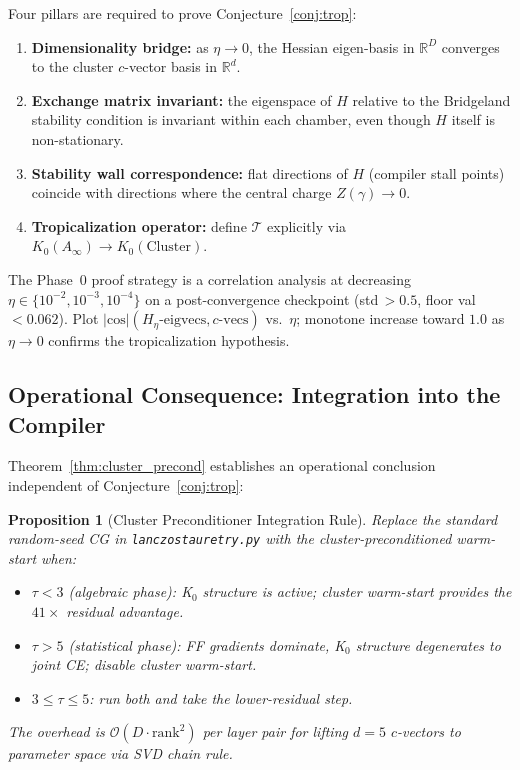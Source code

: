 \documentclass[11pt]{amsart}
\newtheorem{proposition}[theorem]{Proposition}
\begin{document}
Four pillars are required to prove Conjecture~\ref{conj:trop}:
\begin{enumerate}
\item \textbf{Dimensionality bridge:} as $\eta\to 0$, the Hessian
  eigen-basis in $\mathbb{R}^D$ converges to the cluster $c$-vector
  basis in $\mathbb{R}^d$.
\item \textbf{Exchange matrix invariant:} the eigenspace of $H$ relative
  to the Bridgeland stability condition is invariant within each chamber,
  even though $H$ itself is non-stationary.
\item \textbf{Stability wall correspondence:} flat directions of $H$
  (compiler stall points) coincide with directions where the central
  charge $Z(\gamma)\to 0$.
\item \textbf{Tropicalization operator:} define $\mathcal{T}$ explicitly
  via $K_0(A_\infty) \to K_0(\mathrm{Cluster})$.
\end{enumerate}

The Phase~0 proof strategy is a correlation analysis at decreasing
$\eta \in \{10^{-2}, 10^{-3}, 10^{-4}\}$ on a post-convergence
checkpoint (std\,$> 0.5$, floor val\,$< 0.062$).
Plot $|\mathrm{cos}|(H_\eta\text{-eigvecs}, c\text{-vecs})$
vs.\ $\eta$; monotone increase toward $1.0$ as $\eta\to 0$
confirms the tropicalization hypothesis.

\subsection{Operational Consequence: Integration into the Compiler}

Theorem~\ref{thm:cluster_precond} establishes an operational conclusion
independent of Conjecture~\ref{conj:trop}:

\begin{proposition}[Cluster Preconditioner Integration Rule]
Replace the standard random-seed CG in \texttt{lanczos\discretionary{\_}{}{\_}tau\discretionary{\_}{}{\_}retry.py}
with the cluster-preconditioned warm-start when:
\begin{itemize}
\item $\tau < 3$ (algebraic phase): K$_0$ structure is active;
  cluster warm-start provides the $41\times$ residual advantage.
\item $\tau > 5$ (statistical phase): FF gradients dominate, K$_0$
  structure degenerates to joint CE; disable cluster warm-start.
\item $3 \leq \tau \leq 5$: run both and take the lower-residual step.
\end{itemize}
The overhead is $\mathcal{O}(D\cdot\mathrm{rank}^2)$ per layer pair
for lifting $d = 5$ $c$-vectors to parameter space via SVD chain rule.
\end{proposition}
\end{document}
